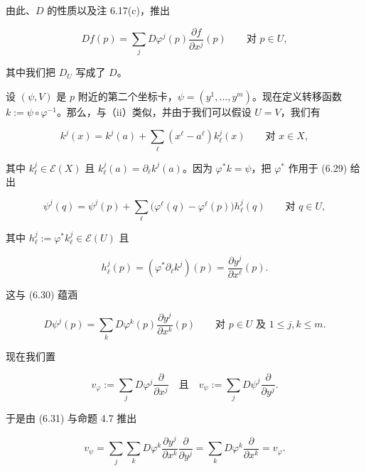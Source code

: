 \begin{theorem}
\begin{subitems}
由此、$ D $ 的性质以及注 6.17(c)，推出

\begin{equation}
Df(p) = \sum_{j} D\varphi^{j}(p) \frac{\partial f}{\partial x^{j}}(p) \qquad \text{对 } p \in U ,\tag{6.28}
\end{equation}

其中我们把 $ D_{U} $ 写成了 $ D $。

\item

设 $ (\psi, V) $ 是 $ p $ 附近的第二个坐标卡，$ \psi = (y^{1}, \ldots, y^{m}) $。现在定义转移函数 $ k := \psi \circ \varphi^{-1} $。那么，与（ii）类似，并由于我们可以假设 $ U = V $，我们有

\begin{equation}
k^{j}(x) = k^{j}(a) + \sum_{\ell} (x^{\ell} - a^{\ell}) k_{\ell}^{j}(x) \qquad \text{对 } x \in X ,\tag{6.29}
\end{equation}

其中 $ k_{\ell}^{j} \in \mathcal{E}(X) $ 且 $ k_{\ell}^{j}(a) = \partial_{\ell} k^{j}(a) $。因为 $ \varphi^{*} k = \psi $，把 $ \varphi^{*} $ 作用于 (6.29) 给出

\begin{equation}
\psi^{j}(q) = \psi^{j}(p) + \sum_{\ell} \bigl(\varphi^{\ell}(q) - \varphi^{\ell}(p)\bigr) h_{\ell}^{j}(q) \qquad \text{对 } q \in U ,\tag{6.30}
\end{equation}

其中 $ h_{\ell}^{j} := \varphi^{*} k_{\ell}^{j} \in \mathcal{E}(U) $ 且

\[
h_{\ell}^{j}(p) = (\varphi^{*} \partial_{\ell} k^{j})(p) = \frac{\partial y^{j}}{\partial x^{\ell}}(p) .
\]

这与 (6.30) 蕴涵

\begin{equation}
D\psi^{j}(p) = \sum_{k} D\varphi^{k}(p) \frac{\partial y^{j}}{\partial x^{k}}(p) \qquad \text{对 } p \in U \text{ 及 } 1 \le j, k \le m .\tag{6.31}
\end{equation}

现在我们置

\begin{equation}
v_{\varphi} := \sum_{j} D\varphi^{j} \frac{\partial}{\partial x^{j}} \quad \text{且} \quad v_{\psi} := \sum_{j} D\psi^{j} \frac{\partial}{\partial y^{j}} .\tag{6.32}
\end{equation}

于是由 (6.31) 与命题 4.7 推出

\[
v_{\psi} = \sum_{j} \sum_{k} D\varphi^{k} \frac{\partial y^{j}}{\partial x^{k}} \frac{\partial}{\partial y^{j}} = \sum_{k} D\varphi^{k} \frac{\partial}{\partial x^{k}} = v_{\varphi} .
\]


\end{subitems}
\end{theorem}

